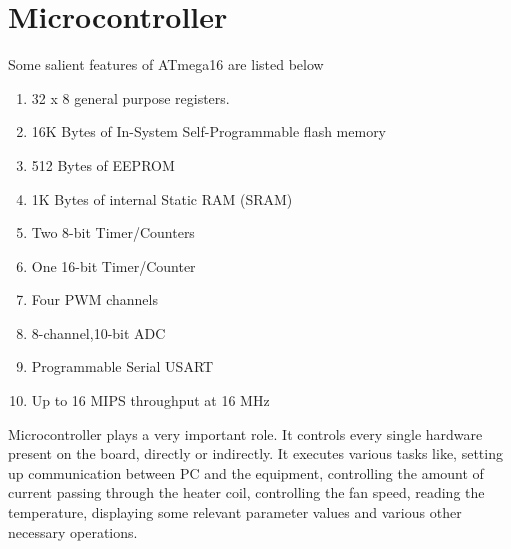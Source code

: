 \documentclass[12pt]{report}
\begin{document}
\section{Microcontroller}
Some salient features of ATmega16 are listed below
\begin{enumerate}
\item 32 x 8 general purpose registers.
\item 16K Bytes of In-System Self-Programmable flash memory
\item 512 Bytes of EEPROM
\item 1K Bytes of internal Static RAM (SRAM)
\item Two 8-bit Timer/Counters
\item One 16-bit Timer/Counter
\item Four PWM channels
\item 8-channel,10-bit ADC
\item Programmable Serial USART
\item Up to 16 MIPS throughput at 16 MHz
\end{enumerate}
Microcontroller plays a very important role. It controls every single hardware present on the board, directly or indirectly. It executes various tasks like, setting up communication between PC and the equipment, controlling the amount of current passing through the heater coil, controlling the fan speed, reading the temperature, displaying some relevant parameter values and various other necessary operations.
\end{document}
